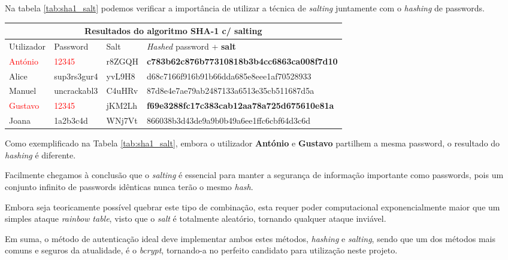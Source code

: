 Na tabela \ref{tab:sha1_salt} podemos verificar a importância de utilizar a técnica de \emph{salting} juntamente com o \emph{hashing} de passwords.
\vspace{-3mm}
\begin{center}
    \begin{tabular}{ |p{1.7cm}|p{2.2cm}|p{1.5cm}|p{8.5cm}|  }
        \hline
        \multicolumn{4}{|c|}{Resultados do algoritmo SHA-1 c/ salting} \\
        \hline
        Utilizador & Password & Salt &\emph{Hashed} password + \textbf{salt}\\
        \hline 
        \textcolor{red}{António} & \textcolor{red}{12345} & r8ZGQH & \textbf{c783b62c876b77310818b3b4cc6863ca008f7d10}\\
        Alice & sup3rs3gur4 & yvL9H8 & d68c7166f916b91b66dda685e8eee1af70528933\\
        Manuel & uncrackabl3 & C4uHRv & 87d8e4e7ae79ab2487133a6513e35cb511687d5a\\
        \textcolor{red}{Gustavo} & \textcolor{red}{12345} & jKM2Lh & \textbf{f69e3288fc17c383cab12aa78a725d675610e81a}\\
        Joana & 1a2b3c4d & WNj7Vt & 866038b3d43de9a9b0b49a6ee1ffc6cbf64d3c6d\\
        \hline
    \end{tabular}
\label{tab:sha1_salt} 
\end{center}
\vspace{-2mm}
Como exemplificado na Tabela \ref{tab:sha1_salt}, embora o utilizador \textbf{António} e \textbf{Gustavo} partilhem a mesma password, o resultado do \emph{hashing} é diferente.

Facilmente chegamos à conclusão que o \emph{salting} é essencial para manter a segurança de informação importante como passwords, pois um conjunto infinito de passwords idênticas nunca terão o mesmo \emph{hash}.

Embora seja teoricamente possível quebrar este tipo de combinação, esta requer poder computacional exponencialmente maior que um simples ataque \emph{rainbow table}, visto que o \emph{salt} é totalmente aleatório, tornando qualquer ataque inviável.

Em suma, o método de autenticação ideal deve implementar ambos estes métodos\cite{contini2015method}, \emph{hashing} e \emph{salting}, sendo que um dos métodos mais comuns e seguros da atualidade, é o \emph{bcrypt}, tornando-a no perfeito candidato para utilização neste projeto.

